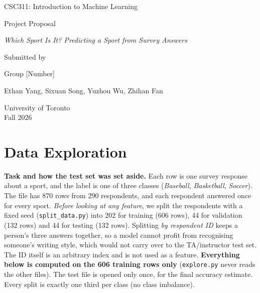 \documentclass[12pt]{article}
\begin{document}
\begin{titlepage}
    \centering
    \vspace*{3cm}

    {\Large {CSC311: Introduction to Machine Learning} \par}
    \vspace{1cm}

    {\Large {Project Proposal} \par}
    \vspace{1cm}

    {\large \textit{Which Sport Is It? Predicting a Sport from Survey Answers} \par}
    \vspace{3cm}

    {\large Submitted by \par}

    \vspace{0.5cm}
    {\large Group [Number]}

    \vspace{0.5cm}
    {\large Ethan Yang, Sixuan Song, Yuzhou Wu, Zhihan Fan \par}

    \vfill
    {\large University of Toronto \\ Fall 2026 \par}
\end{titlepage}
\clearpage
\setcounter{page}{1}



\section{Data Exploration}\label{sec:data-exploration}

\textbf{Task and how the test set was set aside.} Each row is one survey response about a sport, and the label is one of three classes (\textit{Baseball}, \textit{Basketball}, \textit{Soccer}). The file has 870 rows from 290 respondents, and each respondent answered once for every sport. \emph{Before looking at any feature}, we split the respondents with a fixed seed (\texttt{split\_data.py}) into 202 for training (606 rows), 44 for validation (132 rows) and 44 for testing (132 rows). Splitting \emph{by respondent ID} keeps a person's three answers together, so a model cannot profit from recognising someone's writing style, which would not carry over to the TA/instructor test set. The ID itself is an arbitrary index and is not used as a feature. \textbf{Everything below is computed on the 606 training rows only} (\texttt{explore.py} never reads the other files). The test file is opened only once, for the final accuracy estimate. Every split is exactly one third per class (no class imbalance).
\end{document}
